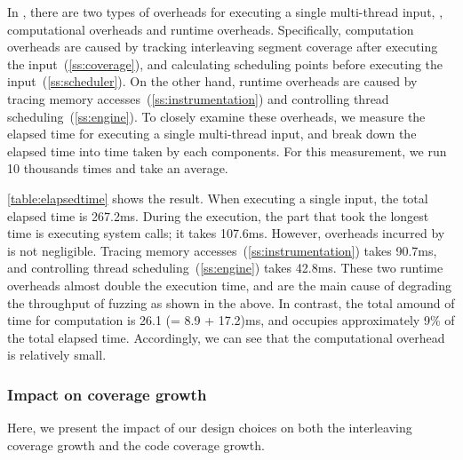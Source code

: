 %
\begin{table}[t]
  \centering
  
  \caption{
    Elapsed time (ms) for executing one multi-thread input. We
    decompose the elapsed time into the system call execution
    (\texttt{Exec. syscall}), \sys's computational overheads
    (\texttt{Comp. overhead}) and runtime overhead (\texttt{Runtime
      overhead}).}
  \label{table:elapsedtime}
  \vspace{-8pt}
\end{table}
%
In \sys, there are two types of overheads for executing a single
multi-thread input, \ie, computational overheads and runtime
overheads.
%
Specifically, computation overheads are caused by tracking
interleaving segment coverage after executing the
input~(\autoref{ss:coverage}), and calculating scheduling points
before executing the input~(\autoref{ss:scheduler}).
%
On the other hand, runtime overheads are caused by tracing memory
accesses~(\autoref{ss:instrumentation}) and controlling thread
scheduling~(\autoref{ss:engine}).
%
To closely examine these overheads, we measure the elapsed time for
executing a single multi-thread input, and break down the elapsed time
into time taken by each components.
%
For this measurement, we run 10 thousands times and take an average.




\autoref{table:elapsedtime} shows the result. When executing a single
input, the total elapsed time is 267.2ms.
%
During the execution, the part that took the longest time is executing
system calls; it takes 107.6ms.
%
However, overheads incurred by \sys is not negligible. Tracing memory
accesses~(\autoref{ss:instrumentation}) takes 90.7ms, and controlling
thread scheduling~(\autoref{ss:engine}) takes 42.8ms. These two
runtime overheads almost double the execution time, and are the main
cause of degrading the throughput of fuzzing as shown in the above.
%
In contrast, the total amound of time for computation is 26.1 (= 8.9 +
17.2)ms, and occupies approximately 9\% of the total elapsed time.
%
Accordingly, we can see that the computational overhead is relatively
small.



\subsubsection{Impact on coverage growth}
\label{sss:component}
%
Here, we present the impact of our design choices on both the
interleaving coverage growth and the code coverage growth.


